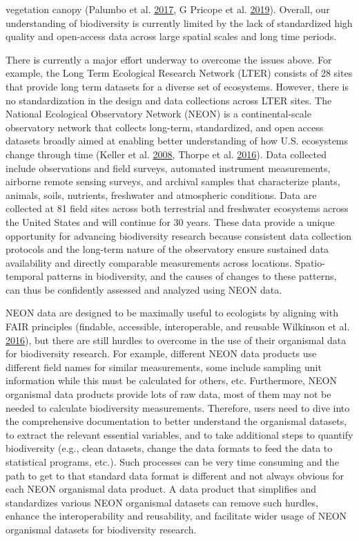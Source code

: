 \documentclass[
  12pt,
]{article}
\begin{document}
vegetation canopy (Palumbo et al. \protect\hyperlink{ref-palumbo2017building}{2017}, G Pricope et al. \protect\hyperlink{ref-g2019remote}{2019}). Overall, our understanding of biodiversity is currently limited by the lack of standardized high quality and open-access data across large spatial scales and long time periods.

There is currently a major effort underway to overcome the issues above. For example, the Long Term Ecological Research Network (LTER) consists of 28 sites that provide long term datasets for a diverse set of ecosystems. However, there is no standardization in the design and data collections across LTER sites. The National Ecological Observatory Network (NEON) is a continental-scale observatory network that collects long-term, standardized, and open access datasets broadly aimed at enabling better understanding of how U.S. ecosystems change through time (Keller et al. \protect\hyperlink{ref-keller2008continental}{2008}, Thorpe et al. \protect\hyperlink{ref-thorpe2016introduction}{2016}). Data collected include observations and field surveys, automated instrument measurements, airborne remote sensing surveys, and archival samples that characterize plants, animals, soils, nutrients, freshwater and atmospheric conditions. Data are collected at 81 field sites across both terrestrial and freshwater ecosystems across the United States and will continue for 30 years. These data provide a unique opportunity for advancing biodiversity research because consistent data collection protocols and the long-term nature of the observatory ensure sustained data availability and directly comparable measurements across locations. Spatio-temporal patterns in biodiversity, and the causes of changes to these patterns, can thus be confidently assessed and analyzed using NEON data.

NEON data are designed to be maximally useful to ecologists by aligning with FAIR principles (findable, accessible, interoperable, and reusable Wilkinson et al. \protect\hyperlink{ref-wilkinson2016fair}{2016}), but there are still hurdles to overcome in the use of their organismal data for biodiversity research. For example, different NEON data products use different field names for similar measurements, some include sampling unit information while this must be calculated for others, etc. Furthermore, NEON organismal data products provide lots of raw data, most of them may not be needed to calculate biodiversity measurements. Therefore, users need to dive into the comprehensive documentation to better understand the organismal datasets, to extract the relevant essential variables, and to take additional steps to quantify biodiversity (e.g., clean datasets, change the data formats to feed the data to statistical programs, etc.). Such processes can be very time consuming and the path to get to that standard data format is different and not always obvious for each NEON organismal data product. A data product that simplifies and standardizes various NEON organismal datasets can remove such hurdles, enhance the interoperability and reusability, and facilitate wider usage of NEON organismal datasets for biodiversity research.
\end{document}
